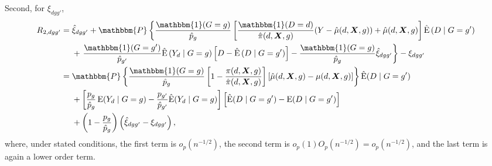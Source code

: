 \documentclass[12pt,a4paper]{article}
\newcommand{\E}{\operatorname{E}}
\def\X{{\boldsymbol X}}
\def\one{\mathbbm{1}}
\def\P{\mathbbm{P}}
\begin{document}
Second, for $\xi_{dgg'}$,
\begin{align*}
    R_{2,dgg'} &= \hat{\xi}_{dgg'}+\P \left\{\frac{\one(G=g)}{\hat{p}_g}  \left[\frac{\one(D=d)}{\hat{\pi}(d,\X,g)}(Y-\hat{\mu}(d,\X,g)) + \hat{\mu}(d,\X,g) \right] \hat{\E} \left(D \mid G=g' \right) \right. \\
    &\phantom{{}={}} + \left. \frac{\one(G=g')}{\hat{p}_{g'}} \hat{\E} \left(Y_d \mid G=g \right) \left[D - \hat{\E} \left(D \mid G=g' \right) \right] - \frac{\one(G=g)}{\hat{p}_g} \hat{\xi}_{dgg'} \right\} - \xi_{dgg'} \\
    &= \P \left\{ \frac{\one(G=g)}{\hat{p}_g} \left[1-\frac{\pi(d,\X,g)}{\hat{\pi}(d,\X,g)} \right]\left[\hat{\mu}(d,\X,g)-\mu(d,\X,g)\right] \right\} \hat{\E}(D\mid G=g') \\
    &\phantom{{}={}} + \left[\frac{p_g}{\hat{p}_g} \E(Y_d \mid G=g) - \frac{p_{g'}}{\hat{p}_{g'}}\hat{\E}(Y_d \mid G=g) \right] \left[\hat{\E}(D \mid G=g') - \E(D\mid G=g') \right] \\
    &\phantom{{}={}} + \left(1-\frac{p_g}{\hat{p}_g}\right) \left(\hat{\xi}_{dgg'}-\xi_{dgg'} \right),
\end{align*}
where, under stated conditions, the first term is $o_p(n^{-1/2})$, the second term is $o_p(1)O_p(n^{-1/2})=o_p(n^{-1/2})$, and the last term is again a lower order term. 
\end{document}
